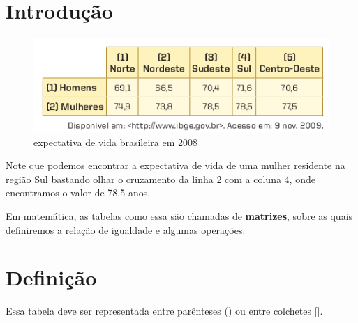 \section{Introdução}

\begin{figure}[htb!]
  \centering
  \includegraphics[width=.6\linewidth]{images/quadro.png}
  \caption{expectativa de vida brasileira em 2008}
  \label{fig:}
\end{figure}

Note que podemos encontrar a expectativa de vida de uma mulher residente na região Sul bastando olhar o cruzamento da linha 2 com a coluna 4, onde encontramos o valor de 78,5 anos. 

Em matemática, as tabelas como essa são chamadas de \textbf{matrizes}, sobre as quais definiremos a relação de igualdade e algumas operações. 

\section{Definição}

Essa tabela deve ser representada entre parênteses () ou entre colchetes [].

\begin{examples}\leavevmode

  \begin{tasks}
  \end{tasks}
  
\end{examples}

